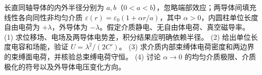 长直同轴导体的内外半径分别为 \(a,b\)（\(0<a<b\)），忽略端部效应；两导体间填充线性各向同性非均匀介质 \(\varepsilon(r)=\varepsilon_0(1+\alpha r/a)\)，其中 \(\alpha>0\)，内圆柱单位长度自由电荷为 \(+\lambda\)，外导体为 \(-\lambda\)。假定介质静电、无自由体电荷、真空磁导率。
(1) 求位移场、电场及两导体电势差，积分结果应明确依赖半径。
(2) 给出单位长度电容和场能，验证 \(U=\lambda^2/(2C')\)。
(3) 求介质内部束缚体电荷密度和两边界的束缚面电荷，并核验总束缚电荷守恒。
(4) 讨论 \(\alpha\to0\) 的均匀介质极限、介质极化的符号以及外导体电压变化方向。
